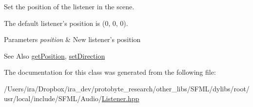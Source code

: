 Set the position of the listener in the scene. 

The default listener's position is (0, 0, 0).


\begin{DoxyParams}{Parameters}
{\em position} & New listener's position\\
\hline
\end{DoxyParams}
\begin{DoxySeeAlso}{See Also}
\hyperlink{classsf_1_1_listener_acd7ee65bc948ca38e1c669aa12340c54}{get\-Position}, \hyperlink{classsf_1_1_listener_ae479dc15513c6557984d26e32d06d06e}{set\-Direction} 
\end{DoxySeeAlso}


The documentation for this class was generated from the following file\-:\begin{DoxyCompactItemize}
\item 
/\-Users/ira/\-Dropbox/ira\-\_\-dev/protobyte\-\_\-research/other\-\_\-libs/\-S\-F\-M\-L/dylibs/root/usr/local/include/\-S\-F\-M\-L/\-Audio/\hyperlink{_listener_8hpp}{Listener.\-hpp}\end{DoxyCompactItemize}
